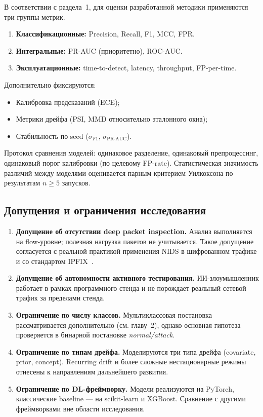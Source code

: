 В соответствии с  раздела~1, для оценки разработанной
методики применяются три группы метрик.

\begin{enumerate}
    \item \textbf{Классификационные:} Precision, Recall, F1, MCC, FPR.
    \item \textbf{Интегральные:} PR-AUC (приоритетно), ROC-AUC.
    \item \textbf{Эксплуатационные:} time-to-detect, latency, throughput,
    FP-per-time.
\end{enumerate}

Дополнительно фиксируются:
\begin{itemize}
    \item Калибровка предсказаний (ECE);
    \item Метрики дрейфа (PSI, MMD относительно эталонного окна);
    \item Стабильность по seed (\(\sigma_{F1}\), \(\sigma_{\text{PR-AUC}}\)).
\end{itemize}

Протокол сравнения моделей: одинаковое разделение, одинаковый препроцессинг,
одинаковый порог калибровки (по целевому FP-rate). Статистическая значимость
различий между моделями оценивается парным критерием Уилкоксона по
результатам \(n \geq 5\) запусков.

\subsection{Допущения и ограничения исследования}

\begin{enumerate}
    \item \textbf{Допущение об отсутствии deep packet inspection.} Анализ
    выполняется на flow-уровне; полезная нагрузка пакетов не учитывается.
    Такое допущение согласуется с реальной практикой применения NIDS в
    шифрованном трафике и со стандартом IPFIX~\cite{rfc7011}.
    \item \textbf{Допущение об автономности активного тестирования.}
    ИИ-злоумышленник работает в рамках программного стенда и не порождает
    реальный сетевой трафик за пределами стенда.
    \item \textbf{Ограничение по числу классов.} Мультиклассовая постановка
    рассматривается дополнительно (см. главу~2), однако основная гипотеза
    проверяется в бинарной постановке \emph{normal/attack}.
    \item \textbf{Ограничение по типам дрейфа.} Моделируются три типа
    дрейфа (covariate, prior, concept). Recurring drift и более сложные
    нестационарные режимы отнесены к направлениям дальнейшего развития.
    \item \textbf{Ограничение по DL-фреймворку.} Модели реализуются на
    PyTorch, классические baseline --- на scikit-learn и XGBoost. Сравнение
    с другими фреймворками вне области исследования.
\end{enumerate}

